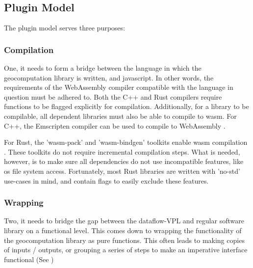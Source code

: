 \subsection{Plugin Model}

The plugin model serves three purposes:

\subsubsection{Compilation}

One, it needs to form a bridge between the language in which the geocomputation library is written, and javascript. 
In other words, the requirements of the WebAssembly compiler compatible with the language in question must be adhered to. 
Both the C++ and Rust compilers require functions to be flagged explicitly for compilation. 
Additionally, for a library to be compilable, all dependent libraries must also be able to compile to wasm.
For C++, the Emscripten compiler can be used to compile to WebAssembly \citep*{emscripten_organization_emscripten_2022}. 

For Rust, the 'wasm-pack' and 'wasm-bindgen' toolkits enable \ac{wasm} compilation \citep{contributors_wasm-bindgen_2022,contributors_wasm-pack_2022}.
These toolkits do not require incremental compilation steps.
What is needed, however, is to make sure all dependencies do not use incompatible features, like os file system access. 
Fortunately, most Rust libraries are written with 'no-std' use-cases in mind, and contain flags to easily exclude these features. 

\subsubsection{Wrapping}

Two, it needs to bridge the gap between the dataflow-VPL and regular software library on a functional level. 
This comes down to wrapping the functionality of the geocomputation library as pure functions. 
This often leads to making copies of inputs / outputs, or grouping a series of steps to make an imperative interface functional (See )

